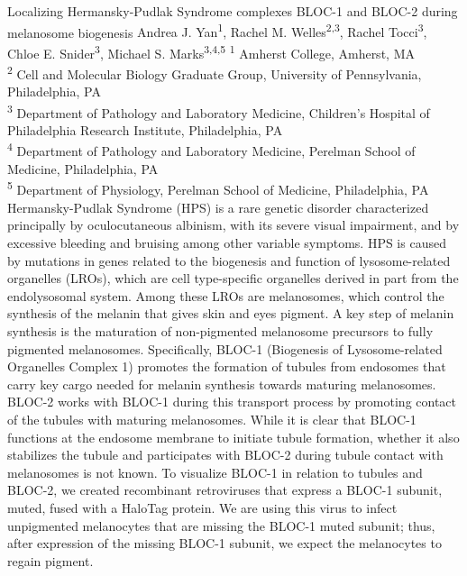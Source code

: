 \makeabstract
    {
    Localizing Hermansky-Pudlak Syndrome complexes BLOC-1 and BLOC-2 during melanosome biogenesis
    }
    {
    Andrea J. Yan\textsuperscript{1}, Rachel M. Welles\textsuperscript{2,3}, Rachel Tocci\textsuperscript{3}, Chloe E. Snider\textsuperscript{3}, Michael S. Marks\textsuperscript{3,4,5}
    }
    {
    \textsuperscript{1} Amherst College, Amherst, MA \\
\textsuperscript{2} Cell and Molecular Biology Graduate Group, University of Pennsylvania, Philadelphia, PA\\
\textsuperscript{3} Department of Pathology and Laboratory Medicine, Children{\textquoteright}s Hospital of Philadelphia Research Institute, Philadelphia, PA\\
\textsuperscript{4} Department of Pathology and Laboratory Medicine, Perelman School of Medicine, Philadelphia, PA\\
\textsuperscript{5} Department of Physiology, Perelman School of Medicine, Philadelphia, PA
    }
    {
    Hermansky-Pudlak Syndrome (HPS) is a rare genetic disorder characterized principally by oculocutaneous albinism, with its severe visual impairment, and by excessive bleeding and bruising among other variable symptoms. HPS is caused by mutations in genes related to the biogenesis and function of lysosome-related organelles (LROs), which are cell type-specific organelles derived in part from the endolysosomal system. Among these LROs are melanosomes, which control the synthesis of the melanin that gives skin and eyes pigment. A key step of melanin synthesis is the maturation of non-pigmented melanosome precursors to fully pigmented melanosomes. Specifically, BLOC-1 (Biogenesis of Lysosome-related Organelles Complex 1) promotes the formation of tubules from endosomes that carry key cargo needed for melanin synthesis towards maturing melanosomes. BLOC-2 works with BLOC-1 during this transport process by promoting contact of the tubules with maturing melanosomes. While it is clear that BLOC-1 functions at the endosome membrane to initiate tubule formation, whether it also stabilizes the tubule and participates with BLOC-2 during tubule contact with melanosomes is not known.
    }
    {
    To visualize BLOC-1 in relation to tubules and BLOC-2, we created recombinant retroviruses that express a BLOC-1 subunit, muted, fused with a HaloTag protein. We are using this virus to infect unpigmented melanocytes that are missing the BLOC-1 muted subunit; thus, after expression of the missing BLOC-1 subunit, we expect the melanocytes to regain pigment.
    }
